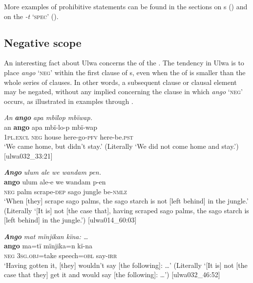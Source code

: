 More examples of prohibitive statements can be found in the sections on  s () and on the   \textit{-t} ‘\textsc{spec}’ ().


\subsection{Negative scope}\label{sec:13.3.4}


An interesting fact about Ulwa  concerns the  of the . The tendency in Ulwa is to place \textit{ango} ‘\textsc{neg}’ within the first clause of s, even when the  of  is smaller than the whole series of clauses. In other words, a subsequent clause or clausal element may be negated, without any  implied concerning the clause in which \textit{ango} ‘\textsc{neg}’ occurs, as illustrated in examples  through .

\ea%
    \label{ex:syntax:168}
          \textit{An} \textbf{\textit{ango}} \textit{apa mbïlop mbïwap.}\\
\gll    an      \textbf{ango}  apa    mbï-lo-p    mbï-wap\\
    1\textsc{pl.excl}  \textsc{neg}  house  here-go-\textsc{pfv}  here-be.\textsc{pst}\\
\glt `We came home, but didn’t stay.’ (Literally ‘We did not come home and stay.’) [ulwa032\_33:21]
\z

\ea%
    \label{ex:syntax:169}
          \textbf{\textit{Ango}} \textit{ulum ale we wandam pen.}\\
\gll    \textbf{ango}  ulum  ale-e    we    wandam  p-en\\
    \textsc{neg}  palm  scrape-\textsc{dep}  sago  jungle    be\textsc{{}-nmlz}\\
\glt `When [they] scrape sago palms, the sago starch is not [left behind] in the jungle.’ (Literally ‘[It is] not [the case that], having scraped sago palms, the sago starch is [left behind] in the jungle.’) [ulwa014\_60:03]
\z

\ea%
    \label{ex:syntax:170}
          \textbf{\textit{Ango}} \textit{mat mïnjikan kïna: …}\\
\gll    \textbf{ango}  ma=tï      mïnjika=n    kï-na\\
    \textsc{neg}  \textsc{3sg.obj}=take  speech=\textsc{obl}  say-\textsc{irr}\\
\glt `Having gotten it, [they] wouldn’t say [the following]: …’ (Literally ‘[It is] not [the case that they] get it and would say [the following]: …’) [ulwa032\_46:52]
\z

